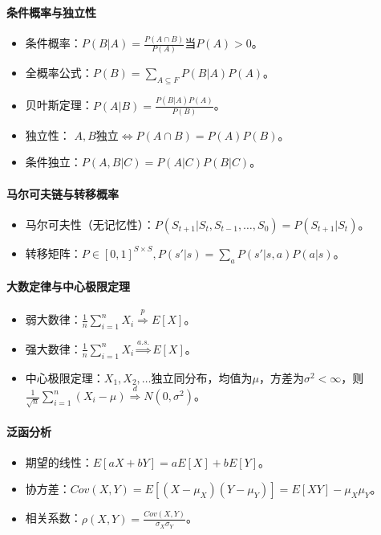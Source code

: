 \documentclass[
12pt, %
a4paper, 
oneside, %
headinclude,footinclude, %
]{scrartcl}
\begin{document}
\paragraph*{条件概率与独立性}
\begin{itemize}
\item 条件概率：$ P(B|A) = \frac{P(A \cap B)}{P(A)}$当$ P(A) > 0 $。
\item 全概率公式：$ P(B) = \sum_{A \subseteq F} P(B|A) P(A) $。
\item 贝叶斯定理：$ P(A|B) = \frac{P(B|A) P(A)}{P(B)} $。
\item 独立性： $ A,B $独立$ \iff P(A \cap B) = P(A)P(B) $。
\item 条件独立：$ P(A ,B|C) = P(A|C)P(B|C) $。
\end{itemize}
\paragraph*{马尔可夫链与转移概率}
\begin{itemize}
\item 马尔可夫性（无记忆性）：$ P(S_{t + 1}|S_t, S_{t - 1}, \dots, S_0) = P(S_{t + 1}|S_t) $。
\item 转移矩阵：$ P \in [0, 1]^{S \times S}, P(s'|s) = \sum_{a} P(s'|s, a) P(a|s) $。
\end{itemize}
\paragraph*{大数定律与中心极限定理}
\begin{itemize}
\item 弱大数律：$ \frac{1}{n} \sum_{i=1}^n X_i \overset{p}{\Longrightarrow} E[X] $。
\item 强大数律：$ \frac{1}{n} \sum_{i=1}^n X_i \overset{a.s.}{\Longrightarrow} E[X] $。
\item 中心极限定理：$ X_1, X_2, \dots $独立同分布，均值为$ \mu $，方差为$ \sigma^2 < \infty $，则$ \frac{1}{\sqrt{n}} \sum_{i=1}^n (X_i - \mu) \overset{d}{\Longrightarrow} N(0, \sigma^2) $。
\end{itemize}
\paragraph*{泛函分析}
\begin{itemize}
\item 期望的线性：$ E[aX + bY] = a E[X] + b E[Y] $。
\item 协方差：$ Cov(X, Y) = E[(X - \mu_X)(Y - \mu_Y)] = E[XY] - \mu_X \mu_Y $。
\item 相关系数：$ \rho(X, Y) = \frac{Cov(X, Y)}{\sigma_X \sigma_Y} $。
\end{itemize}
\end{document}
